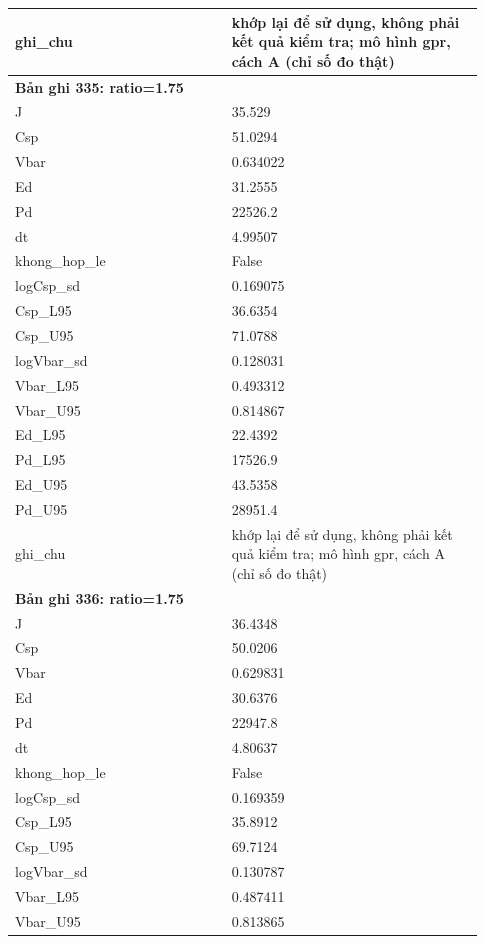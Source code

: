 \begin{longtable}{p{0.43\linewidth}p{0.50\linewidth}}
ghi\_\allowbreak chu & khớp lại để sử dụng, không phải kết quả kiểm tra; mô hình gpr, cách A (chỉ số đo thật) \\
\midrule
\multicolumn{2}{p{0.95\linewidth}}{\textbf{Bản ghi 335: ratio=1.75}} \\
J & 35.529 \\
Csp & 51.0294 \\
Vbar & 0.634022 \\
Ed & 31.2555 \\
Pd & 22526.2 \\
dt & 4.99507 \\
khong\_\allowbreak hop\_\allowbreak le & False \\
logCsp\_\allowbreak sd & 0.169075 \\
Csp\_\allowbreak L95 & 36.6354 \\
Csp\_\allowbreak U95 & 71.0788 \\
logVbar\_\allowbreak sd & 0.128031 \\
Vbar\_\allowbreak L95 & 0.493312 \\
Vbar\_\allowbreak U95 & 0.814867 \\
Ed\_\allowbreak L95 & 22.4392 \\
Pd\_\allowbreak L95 & 17526.9 \\
Ed\_\allowbreak U95 & 43.5358 \\
Pd\_\allowbreak U95 & 28951.4 \\
ghi\_\allowbreak chu & khớp lại để sử dụng, không phải kết quả kiểm tra; mô hình gpr, cách A (chỉ số đo thật) \\
\midrule
\multicolumn{2}{p{0.95\linewidth}}{\textbf{Bản ghi 336: ratio=1.75}} \\
J & 36.4348 \\
Csp & 50.0206 \\
Vbar & 0.629831 \\
Ed & 30.6376 \\
Pd & 22947.8 \\
dt & 4.80637 \\
khong\_\allowbreak hop\_\allowbreak le & False \\
logCsp\_\allowbreak sd & 0.169359 \\
Csp\_\allowbreak L95 & 35.8912 \\
Csp\_\allowbreak U95 & 69.7124 \\
logVbar\_\allowbreak sd & 0.130787 \\
Vbar\_\allowbreak L95 & 0.487411 \\
Vbar\_\allowbreak U95 & 0.813865 \\

\end{longtable}
